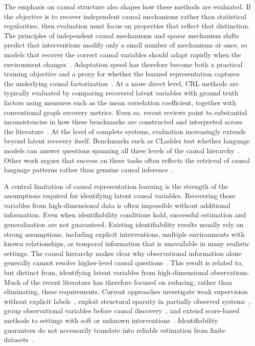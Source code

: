 \documentclass[acmsmall,screen,review,anonymous]{acmart}
\begin{document}
The emphasis on causal structure also shapes how these methods are evaluated.
%
If the objective is to recover independent causal mechanisms rather than statistical regularities, then evaluation must focus on properties that reflect that distinction.
%
The principles of independent causal mechanisms and sparse mechanism shifts predict that interventions modify only a small number of mechanisms at once, so models that recover the correct causal variables should adapt rapidly when the environment changes~\citep{scholkopf2021, parascandolo2018icm}.
%
Adaptation speed has therefore become both a practical training objective and a proxy for whether the learned representation captures the underlying causal factorization~\citep{bengio2020meta}.
%
At a more direct level, CRL methods are typically evaluated by comparing recovered latent variables with ground truth factors using measures such as the mean correlation coefficient, together with conventional graph recovery metrics.
%
Even so, recent reviews point to substantial inconsistencies in how these benchmarks are constructed and interpreted across the literature~\citep{causalverse2025}.
%
At the level of complete systems, evaluation increasingly extends beyond latent recovery itself.
%
Benchmarks such as CLadder test whether language models can answer questions spanning all three levels of the causal hierarchy~\citep{jin2023cladder}.
%
Other work argues that success on these tasks often reflects the retrieval of causal language patterns rather than genuine causal inference~\citep{zevcevic2023causal, kiciman2024causal}.

A central limitation of causal representation learning is the strength of the assumptions required for identifying latent causal variables.
%
Recovering those variables from high-dimensional data is often impossible without additional information.
%
Even when identifiability conditions hold, successful estimation and generalization are not guaranteed.
%
Existing identifiability results usually rely on strong assumptions, including explicit interventions, multiple environments with known relationships, or temporal information that is unavailable in many realistic settings. 
%
The causal hierarchy makes clear why observational information alone generally cannot resolve higher-level causal questions~\citep{bareinboim2022hierarchy}.
%
This result is related to, but distinct from, identifying latent variables from high-dimensional observations.
%
Much of the recent literature has therefore focused on reducing, rather than eliminating, these requirements.
%
Current approaches investigate weak supervision without explicit labels~\citep{brehmer2022weakly}, exploit structural sparsity in partially observed systems~\citep{xu2024sparsity}, group observational variables before causal discovery~\citep{morioka2024grouping}, and extend score-based methods to settings with soft or unknown interventions~\citep{varici2025score}.
%
Identifiability guarantees do not necessarily translate into reliable estimation from finite datasets~\citep{welch2024identifiability}.
\end{document}

